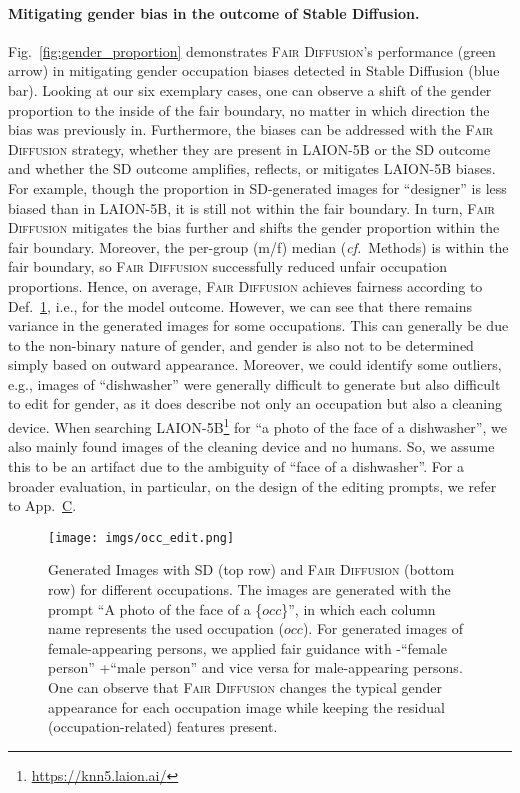 \documentclass{article}%
\newcommand{\cf}{\emph{cf.}~}
\begin{document}
\paragraph{Mitigating gender bias in the outcome of Stable Diffusion.}
Fig.~\ref{fig:gender_proportion} demonstrates \textsc{Fair Diffusion}'s performance (green arrow) in mitigating gender occupation biases detected in Stable Diffusion (blue bar). 
Looking at our six exemplary cases, one can observe a shift of the gender proportion to the inside of the fair boundary, no matter in which direction the bias was previously in. 
Furthermore, the biases can be addressed with the \textsc{Fair Diffusion} strategy, whether they are present in LAION-5B or the SD outcome and whether the SD outcome amplifies, reflects, or mitigates LAION-5B biases. For example, though the proportion in SD-generated images for ``designer'' is less biased than in LAION-5B, it is still not within the fair boundary. In turn, \textsc{Fair Diffusion} mitigates the bias further and shifts the gender proportion within the fair boundary.
Moreover, the per-group (m/f) median (\cf Methods) is within the fair boundary, so \textsc{Fair Diffusion} successfully reduced unfair occupation proportions. Hence, on average, \textsc{Fair Diffusion} achieves fairness according to Def.~\hyperref[def:fair1]{1}, i.e., for the model outcome. 
However, we can see that there remains variance in the generated images for some occupations. This can generally be due to the non-binary nature of gender, and gender is also not to be determined simply based on outward appearance. Moreover, we could identify some outliers, e.g., images of ``dishwasher'' were generally difficult to generate but also difficult to edit for gender, as it does describe not only an occupation but also a cleaning device. When searching LAION-5B\footnote{\url{https://knn5.laion.ai/}} for ``a photo of the face of a dishwasher'', we also mainly found images of the cleaning device and no humans. So, we assume this to be an artifact due to the ambiguity of ``face of a dishwasher''. For a broader evaluation, in particular, on the design of the editing prompts, we refer to App.~\hyperref[sec:dif-setups]{C}.

\begin{figure}[t]
    \centering
    \texttt{[image: imgs/occ\_edit.png]}
    \caption{Generated Images with SD (top row) and \textsc{Fair Diffusion} (bottom row) for different occupations. The images are generated with the prompt ``A photo of the face of a \{$occ$\}'', in which each column name represents the used occupation ($occ$). For generated images of female-appearing persons, we applied fair guidance with -``female person'' +``male person'' and vice versa for male-appearing persons.
    One can observe that \textsc{Fair Diffusion} changes the typical gender appearance for each occupation image while keeping the residual (occupation-related) features present.}
    \label{fig:occupation_example}
\end{figure}
\end{document}

